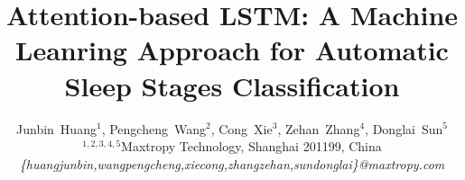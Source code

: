 \documentclass[journal]{IEEEtran}
\begin{document}
%
\title{Attention-based LSTM: A Machine Leanring Approach for Automatic Sleep Stages Classification}
%
%
%

\author{Junbin~Huang$^{1}$,
        Pengcheng~Wang$^{2}$,
        Cong~Xie$^{3}$,
        Zehan~Zhang$^{4}$,
        Donglai~Sun$^{5}$\\
        \bigskip 
        $^{1,2,3,4,5}$Maxtropy Technology, Shanghai 201199, China\\
        \textit{\{huangjunbin,wangpengcheng,xiecong,zhangzehan,sundonglai\}@maxtropy.com}
}

% 
%
\end{document}

